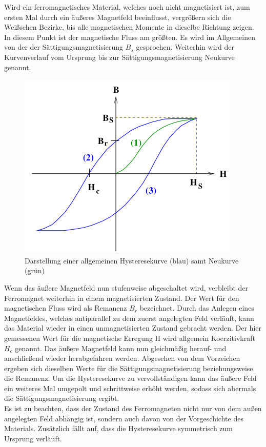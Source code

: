 Wird ein ferromagnetisches Material, welches noch nicht magnetisiert ist, zum ersten Mal durch ein äußeres
Magnetfeld beeinflusst, vergrößern sich die Weißschen Bezirke, bis alle magnetischen Momente in dieselbe Richtung zeigen.
In diesem Punkt ist der magnetische Fluss am größten. Es wird im Allgemeinen von der der Sättigungsmagnetisierung $B_s$ gesprochen.
Weiterhin wird der Kurvenverlauf vom Ursprung bis zur Sättigungsmagnetisierung Neukurve genannt.
\begin{figure}[H]
    \centering
    \includegraphics{Bild1.png}
    \caption{Darstellung einer allgemeinen Hysteresekurve (blau) samt Neukurve (grün) }
    \label{Hysteresekurve}
\end{figure}
\noindent
Wenn das äußere Magnetfeld nun stufenweise abgeschaltet wird, verbleibt der Ferromagnet weiterhin in einem
magnetisierten Zustand. Der Wert für den magnetischen Fluss wird als Remanenz $B_r$ bezeichnet. Durch das Anlegen eines Magnetfeldes, welches antiparallel zu dem 
zuerst angelegten Feld verläuft, kann das Material wieder in einen unmagnetisierten Zustand gebracht werden. Der hier gemessenen Wert 
für die magnetische Erregung H wird allgemein Koerzitivkraft $H_c$ genannt. Das äußere Magnetfeld kann nun gleichmäßig herauf- und anschließend wieder herabgefahren werden.
Abgesehen von dem Vorzeichen ergeben sich dieselben Werte für die Sättigungsmagnetisierung beziehungsweise die Remanenz. Um die Hysteresekurve
zu vervollständigen kann das äußere Feld ein weiteres Mal umgepolt und schrittweise erhöht werden, sodass sich abermals die Sättigungsmagnetisierung
ergibt. 
\\
Es ist zu beachten, dass der Zustand des Ferromagneten nicht nur von dem außen angelegten Feld abhängig ist, sondern auch davon
von der Vorgeschichte des Materials. Zusätzlich fällt auf, dass die Hysteresekurve symmetrisch zum Ursprung verläuft.
